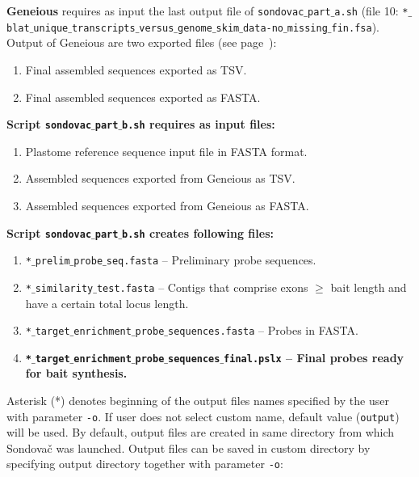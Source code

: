 \documentclass[a4paper, 11pt, twoside]{article}
\begin{document}
\textbf{Geneious} requires as input the last output file of \texttt{sondovac$\_$part$\_$a.sh} (file 10: \texttt{*$\_$blat$\_$\allowbreak unique$\_$\allowbreak transcripts$\_$\allowbreak versus$\_$\allowbreak genome$\_$\allowbreak skim$\_$\allowbreak data-no$\_$\allowbreak missing$\_$\allowbreak fin.fsa}). Output of Geneious are two exported files (see page~\pageref{geneious-usage}):

\begin{enumerate}
  \item Final assembled sequences exported as TSV.
  \item Final assembled sequences exported as FASTA.
\end{enumerate}

\textbf{Script \texttt{sondovac$\_$part$\_$b.sh} requires as input files:}

\begin{enumerate}
  \item Plastome reference sequence input file in FASTA format.
  \item Assembled sequences exported from Geneious as TSV.
  \item Assembled sequences exported from Geneious as FASTA.
\end{enumerate}

\textbf{Script \texttt{sondovac$\_$part$\_$b.sh} creates following files:}

\begin{enumerate}
  \item \texttt{*$\_$prelim$\_$probe$\_$seq.fasta} -- Preliminary probe sequences.
  \item \texttt{*$\_$similarity$\_$test.fasta} -- Contigs that comprise exons $\geq$ bait length and have a certain total locus length.
  \item \texttt{*$\_$target$\_$enrichment$\_$probe$\_$sequences.fasta} -- Probes in FASTA.
  \item \textbf{\texttt{*$\_$target$\_$enrichment$\_$probe$\_$sequences$\_$final.pslx} -- Final probes ready for bait synthesis.}
\end{enumerate}

Asterisk (*) denotes beginning of the output files names specified by the user with parameter \texttt{-o}. If user does not select custom name, default value (\texttt{output}) will be used. By default, output files are created in same directory from which Sondovač was launched. Output files can be saved in custom directory by specifying output directory together with parameter \texttt{-o}:
\end{document}
